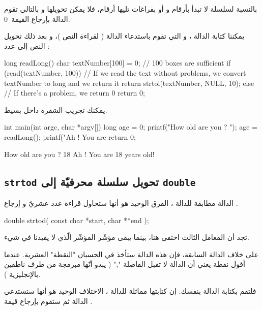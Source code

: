 بالنسبة لسلسلة لا تبدأ بأرقام و أو بفراغات تليها أرقام، فلا يمكن تحويلها و بالتالي تقوم الدالة بإرجاع القيمة~0.

يمكننا كتابة الدالة
،
و التي تقوم باستدعاء الدالة
( لقراءة النص )، و بعد ذلك تحويل النص إلى عدد :

\begin{Csource}
  long readLong()
  {
  	char textNumber[100] = {0}; // 100 boxes are sufficient
  	if (read(textNumber, 100))
  	{
      		// If we read the text without problems, we convert textNumber to long and we return it
      		 return strtol(textNumber, NULL, 10);
  	}
  	else
  	{
      		 // If there’s a problem, we return 0
      		return 0;
  	 }
  }
\end{Csource}

يمكنك تجريب الشفرة داخل
بسيط.

\begin{Csource}
  int main(int argc, char *argv[])
  {
  	long age = 0;
  	printf("How old are you ? ");
  	age = readLong();
  	printf("Ah ! You are %
  	return 0;
  }
\end{Csource}

\begin{Console}
How old are you ? 18
Ah ! You are 18 years old!
\end{Console}

\subsection{\texttt{strtod} تحويل سلسلة محرفيّة إلى \texttt{double}}

الدالة
مطابقة للدالة
،
الفرق الوحيد هو أنها ستحاول قراءة عدد عشريّ و إرجاع
.

\begin{Csource}
double strtod( const char *start, char **end );
\end{Csource}

تجد أن المعامل الثالث
اختفى هنا، بينما يبقى مؤشّر المؤشّر
الّذي لا يفيدنا في شيء.

على خلاف الدالة السابقة، فإن هذه الدالة ستأخذ في الحسبان "النقطة" العشرية. عندما أقول نقطة يعني أن الدالة لا تقبل الفاصلة
"\textenglish{,}"
( يبدو أنّها مبرمجة من طرف ناطقين بالإنجليزية ).

فلتقم بكتابة الدالة
بنفسك. إن كتابتها مماثلة للدالة
،
الاختلاف الوحيد هو أنها ستستدعي الدالة
ثم ستقوم بإرجاع قيمة
.

